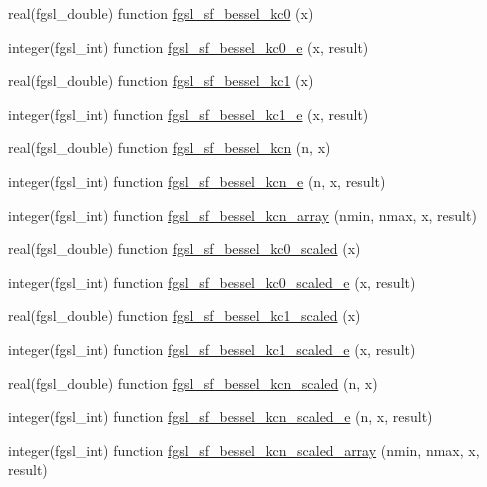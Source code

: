 \begin{DoxyCompactItemize}
real(fgsl\+\_\+double) function \hyperlink{specfunc_8finc_ac1738fb58677153aebb95154e0cb15fc}{fgsl\+\_\+sf\+\_\+bessel\+\_\+kc0} (x)
\item 
integer(fgsl\+\_\+int) function \hyperlink{specfunc_8finc_a4c3f1b48377b63e306013e0d3ed2fc47}{fgsl\+\_\+sf\+\_\+bessel\+\_\+kc0\+\_\+e} (x, result)
\item 
real(fgsl\+\_\+double) function \hyperlink{specfunc_8finc_a53ef70e6a6af47bfcdca7e3b5166213a}{fgsl\+\_\+sf\+\_\+bessel\+\_\+kc1} (x)
\item 
integer(fgsl\+\_\+int) function \hyperlink{specfunc_8finc_a188436151ab0e62e67c63c3f7a4dbc43}{fgsl\+\_\+sf\+\_\+bessel\+\_\+kc1\+\_\+e} (x, result)
\item 
real(fgsl\+\_\+double) function \hyperlink{specfunc_8finc_a43affe20564cff1ca8ebf59e536a4a51}{fgsl\+\_\+sf\+\_\+bessel\+\_\+kcn} (n, x)
\item 
integer(fgsl\+\_\+int) function \hyperlink{specfunc_8finc_a51ae1fce2df99aac942fe51242f0460b}{fgsl\+\_\+sf\+\_\+bessel\+\_\+kcn\+\_\+e} (n, x, result)
\item 
integer(fgsl\+\_\+int) function \hyperlink{specfunc_8finc_a7285353c97655105247f0d232b65a5ac}{fgsl\+\_\+sf\+\_\+bessel\+\_\+kcn\+\_\+array} (nmin, nmax, x, result)
\item 
real(fgsl\+\_\+double) function \hyperlink{specfunc_8finc_ad7c1b7c76d6881306f5aa9f0d4a1c498}{fgsl\+\_\+sf\+\_\+bessel\+\_\+kc0\+\_\+scaled} (x)
\item 
integer(fgsl\+\_\+int) function \hyperlink{specfunc_8finc_a7a0524a18062458bed82c133810231f5}{fgsl\+\_\+sf\+\_\+bessel\+\_\+kc0\+\_\+scaled\+\_\+e} (x, result)
\item 
real(fgsl\+\_\+double) function \hyperlink{specfunc_8finc_a1fa7add25cfe89073f4640118a6a3a0d}{fgsl\+\_\+sf\+\_\+bessel\+\_\+kc1\+\_\+scaled} (x)
\item 
integer(fgsl\+\_\+int) function \hyperlink{specfunc_8finc_a6edc260c54c8a66b67d0df91d5b4056c}{fgsl\+\_\+sf\+\_\+bessel\+\_\+kc1\+\_\+scaled\+\_\+e} (x, result)
\item 
real(fgsl\+\_\+double) function \hyperlink{specfunc_8finc_ab65bd6ab8ef876d3c550390bf2206a00}{fgsl\+\_\+sf\+\_\+bessel\+\_\+kcn\+\_\+scaled} (n, x)
\item 
integer(fgsl\+\_\+int) function \hyperlink{specfunc_8finc_a797130c78ea5076eb86b51cd564334fa}{fgsl\+\_\+sf\+\_\+bessel\+\_\+kcn\+\_\+scaled\+\_\+e} (n, x, result)
\item 
integer(fgsl\+\_\+int) function \hyperlink{specfunc_8finc_a7a521e31cb6419d89eeb73ffc086a508}{fgsl\+\_\+sf\+\_\+bessel\+\_\+kcn\+\_\+scaled\+\_\+array} (nmin, nmax, x, result)

\end{DoxyCompactItemize}
